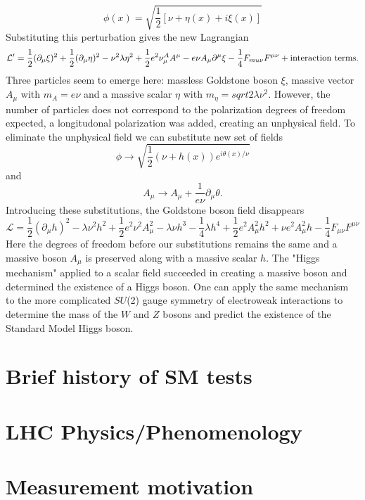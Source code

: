 \begin{equation}
\phi(x) =\sqrt{\frac{1}{2}[\nu+\eta(x)+i\xi(x)]}
\end{equation}
Substituting this perturbation gives the new Lagrangian
\begin{equation}
\mathcal{L}'=\frac{1}{2}(\partial_\mu\xi)^2+\frac{1}{2}(\partial_\mu\eta)^2-\nu^2\lambda\eta^2+\frac{1}{2}e^2\nu^A_\mu A^\mu-e\nu A_\mu \partial^\mu\xi-\frac{1}{4}F_{mu\nu}F^{\mu\nu} + \textnormal{interaction terms}.
\end{equation}
Three particles seem to emerge here: massless Goldstone boson $\xi$, massive vector $A_\mu$ with $m_A=e\nu$ and a massive scalar $\eta$ with $m_\eta=sqrt{2\lambda\nu^2}$. However, the number of particles does not correspond to the polarization degrees of freedom expected, a longitudonal polarization was added, creating an unphysical field. To eliminate the unphysical field we can substitute new set of fields 
\begin{equation}
\phi \rightarrow \sqrt{\frac{1}{2}(\nu+h(x))e^{i\theta(x)/\nu}}
\end{equation}
and 
\begin{equation}
A_\mu \rightarrow A_\mu + \frac{1}{e\nu} \partial_\mu\theta.
\end{equation}
Introducing these substitutions, the Goldstone boson field disappears
\begin{equation}
\mathcal{L} = \frac{1}{2}(\partial_\mu h)^2 -\lambda\nu^2h^2+\frac{1}{2}e^2\nu^2A_\mu^2-\lambda\nu h^3-\frac{1}{4}\lambda h^4+\frac{1}{2}e^2A_\mu^2h^2+\nu e^2A_\mu^2h-\frac{1}{4}F_{\mu\nu}F^{\mu\nu}
\end{equation}
Here the degrees of freedom before our substitutions remains the same and a massive boson $A_\mu$ is preserved along with a massive scalar $h$. The "Higgs mechanism" applied to a scalar field succeeded in creating a massive boson and determined the existence of a Higgs boson. One can apply the same mechanism to the more complicated $SU$(2) gauge symmetry of electroweak interactions to determine the mass of the $W$ and $Z$ bosons and predict the existence of the Standard Model Higgs boson. 


\section{Brief history of SM tests}

\section{LHC Physics/Phenomenology}

\section{Measurement motivation}

